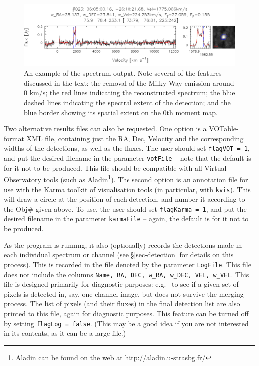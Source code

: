 \documentclass[12pt,a4paper]{article}
\newcommand{\eg}{e.g.\ }
\begin{document}
\begin{figure}[t]
\begin{center}
\includegraphics[width=\textwidth]{example_spectrum}
\end{center}
\caption{\footnotesize An example of the spectrum output. Note several
  of the features discussed in the text: the removal of the Milky Way
  emission around 0 km/s; the red lines indicating the reconstructed
  spectrum; the blue dashed lines indicating the spectral extent of
  the detection; and the blue border showing its spatial extent on the
  0th moment map.}
\label{fig-spect}
\end{figure}

Two alternative results files can also be requested. One option is a
VOTable-format XML file, containing just the RA, Dec, Velocity and the
corresponding widths of the detections, as well as the fluxes. The
user should set {\tt flagVOT = 1}, and put the desired filename in the
parameter {\tt votFile} -- note that the default is for it not to be
produced. This file should be compatible with all Virtual Observatory
tools (such as Aladin\footnote{ Aladin can be found on the web at
\href{http://aladin.u-strasbg.fr/}{http://aladin.u-strasbg.fr/}}). The
second option is an annotation file for use with the Karma toolkit of
visualisation tools (in particular, with {\tt kvis}). This will draw a
circle at the position of each detection, and number it according to
the Obj\# given above. To use, the user should set {\tt flagKarma = 1},
and put the desired filename in the parameter {\tt karmaFile} -- again,
the default is for it not to be produced.

As the program is running, it also (optionally) records the detections
made in each individual spectrum or channel (see
\S\ref{sec-detection} for details on this process). This is
recorded in the file denoted by the parameter {\tt LogFile}. This file
does not include the columns {\tt Name, RA, DEC, w\_RA, w\_DEC, VEL,
w\_VEL}. This file is designed primarily for diagnostic purposes: \eg
to see if a given set of pixels is detected in, say, one channel
image, but does not survive the merging process. The list of pixels
(and their fluxes) in the final detection list are also printed to
this file, again for diagnostic purposes. This feature can be turned
off by setting {\tt flagLog = false}. (This may be a good idea if you
are not interested in its contents, as it can be a large file.)
\end{document}
